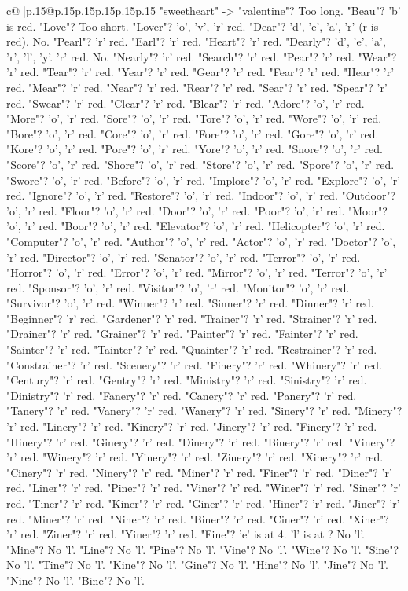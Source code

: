 \documentclass{article}
\begin{document}
{\begin{supertabular}{c@{$\;$}|p{.15\linewidth}@{}p{.15\linewidth}p{.15\linewidth}p{.15\linewidth}p{.15\linewidth}p{.15\linewidth}}
{{{"sweetheart" {-}> "valentine"? Too long. "Beau"? 'b' is red. "Love"? Too short. "Lover"? 'o', 'v', 'r' red. "Dear"? 'd', 'e', 'a', 'r' (r is red). No. "Pearl"? 'r' red. "Earl"? 'r' red. "Heart"? 'r' red. "Dearly"? 'd', 'e', 'a', 'r', 'l', 'y'. 'r' red. No. "Nearly"? 'r' red. "Search"? 'r' red. "Pear"? 'r' red. "Wear"? 'r' red. "Tear"? 'r' red. "Year"? 'r' red. "Gear"? 'r' red. "Fear"? 'r' red. "Hear"? 'r' red. "Mear"? 'r' red. "Near"? 'r' red. "Rear"? 'r' red. "Sear"? 'r' red. "Spear"? 'r' red. "Swear"? 'r' red. "Clear"? 'r' red. "Blear"? 'r' red. "Adore"? 'o', 'r' red. "More"? 'o', 'r' red. "Sore"? 'o', 'r' red. "Tore"? 'o', 'r' red. "Wore"? 'o', 'r' red. "Bore"? 'o', 'r' red. "Core"? 'o', 'r' red. "Fore"? 'o', 'r' red. "Gore"? 'o', 'r' red. "Kore"? 'o', 'r' red. "Pore"? 'o', 'r' red. "Yore"? 'o', 'r' red. "Snore"? 'o', 'r' red. "Score"? 'o', 'r' red. "Shore"? 'o', 'r' red. "Store"? 'o', 'r' red. "Spore"? 'o', 'r' red. "Swore"? 'o', 'r' red. "Before"? 'o', 'r' red. "Implore"? 'o', 'r' red. "Explore"? 'o', 'r' red. "Ignore"? 'o', 'r' red. "Restore"? 'o', 'r' red. "Indoor"? 'o', 'r' red. "Outdoor"? 'o', 'r' red. "Floor"? 'o', 'r' red. "Door"? 'o', 'r' red. "Poor"? 'o', 'r' red. "Moor"? 'o', 'r' red. "Boor"? 'o', 'r' red. "Elevator"? 'o', 'r' red. "Helicopter"? 'o', 'r' red. "Computer"? 'o', 'r' red. "Author"? 'o', 'r' red. "Actor"? 'o', 'r' red. "Doctor"? 'o', 'r' red. "Director"? 'o', 'r' red. "Senator"? 'o', 'r' red. "Terror"? 'o', 'r' red. "Horror"? 'o', 'r' red. "Error"? 'o', 'r' red. "Mirror"? 'o', 'r' red. "Terror"? 'o', 'r' red. "Sponsor"? 'o', 'r' red. "Visitor"? 'o', 'r' red. "Monitor"? 'o', 'r' red. "Survivor"? 'o', 'r' red. "Winner"? 'r' red. "Sinner"? 'r' red. "Dinner"? 'r' red. "Beginner"? 'r' red. "Gardener"? 'r' red. "Trainer"? 'r' red. "Strainer"? 'r' red. "Drainer"? 'r' red. "Grainer"? 'r' red. "Painter"? 'r' red. "Fainter"? 'r' red. "Sainter"? 'r' red. "Tainter"? 'r' red. "Quainter"? 'r' red. "Restrainer"? 'r' red. "Constrainer"? 'r' red. "Scenery"? 'r' red. "Finery"? 'r' red. "Whinery"? 'r' red. "Century"? 'r' red. "Gentry"? 'r' red. "Ministry"? 'r' red. "Sinistry"? 'r' red. "Dinistry"? 'r' red. "Fanery"? 'r' red. "Canery"? 'r' red. "Panery"? 'r' red. "Tanery"? 'r' red. "Vanery"? 'r' red. "Wanery"? 'r' red. "Sinery"? 'r' red. "Minery"? 'r' red. "Linery"? 'r' red. "Kinery"? 'r' red. "Jinery"? 'r' red. "Finery"? 'r' red. "Hinery"? 'r' red. "Ginery"? 'r' red. "Dinery"? 'r' red. "Binery"? 'r' red. "Vinery"? 'r' red. "Winery"? 'r' red. "Yinery"? 'r' red. "Zinery"? 'r' red. "Xinery"? 'r' red. "Cinery"? 'r' red. "Ninery"? 'r' red. "Miner"? 'r' red. "Finer"? 'r' red. "Diner"? 'r' red. "Liner"? 'r' red. "Piner"? 'r' red. "Viner"? 'r' red. "Winer"? 'r' red. "Siner"? 'r' red. "Tiner"? 'r' red. "Kiner"? 'r' red. "Giner"? 'r' red. "Hiner"? 'r' red. "Jiner"? 'r' red. "Miner"? 'r' red. "Niner"? 'r' red. "Biner"? 'r' red. "Ciner"? 'r' red. "Xiner"? 'r' red. "Ziner"? 'r' red. "Yiner"? 'r' red. "Fine"? 'e' is at 4. 'l' is at ? No 'l'. "Mine"? No 'l'. "Line"? No 'l'. "Pine"? No 'l'. "Vine"? No 'l'. "Wine"? No 'l'. "Sine"? No 'l'. "Tine"? No 'l'. "Kine"? No 'l'. "Gine"? No 'l'. "Hine"? No 'l'. "Jine"? No 'l'. "Nine"? No 'l'. "Bine"? No 'l'. }}}
\end{supertabular}}
\end{document}
